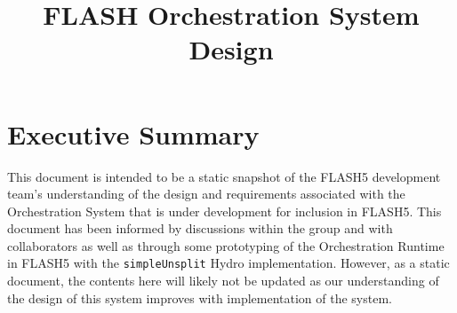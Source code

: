 \documentclass{article}
\title{FLASH Orchestration System Design}
\begin{document}
\theoremstyle{definition} %
\newtheorem{req}{Req}[section]
\newtheorem{spec}{Spec}[section]

\maketitle

\section{Executive Summary}
This document is intended to be a static snapshot of the FLASH5 development
team's understanding of the design and requirements associated with the
Orchestration System that is under development for inclusion in FLASH5.  This
document has been informed by discussions within the group and with
collaborators as well as through some prototyping of the Orchestration Runtime
in FLASH5 with the \texttt{simpleUnsplit} Hydro implementation.  However, as a
static document, the contents here will likely not be updated as our
understanding of the design of this system improves with implementation of the
system.\\
\end{document}
